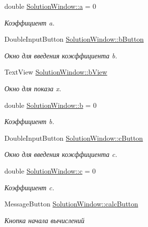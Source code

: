 \begin{DoxyCompactItemize}
double \hyperlink{group___u_i_ga4a34577d3eee1be3aa79ae62b4292ee3}{SolutionWindow::a} = 0
\begin{DoxyCompactList}\small\item\em Коэффициент a. \item\end{DoxyCompactList}\item 
DoubleInputButton \hyperlink{group___u_i_ga2a7741741b2199ac222556281f1474c0}{SolutionWindow::bButton}
\begin{DoxyCompactList}\small\item\em Окно для введения кожффициента b. \item\end{DoxyCompactList}\item 
TextView \hyperlink{group___u_i_ga5bbdd7ce43a736efddb212202d968229}{SolutionWindow::bView}
\begin{DoxyCompactList}\small\item\em Окно для показа x. \item\end{DoxyCompactList}\item 
double \hyperlink{group___u_i_ga4309ca79bdd7b0fedaedecb6e6e31f04}{SolutionWindow::b} = 0
\begin{DoxyCompactList}\small\item\em Коэффициент b. \item\end{DoxyCompactList}\item 
DoubleInputButton \hyperlink{group___u_i_ga22a74e860b6aa9a54dc402636fdb6b38}{SolutionWindow::cButton}
\begin{DoxyCompactList}\small\item\em Окно для введения кожффициента c. \item\end{DoxyCompactList}\item 
double \hyperlink{group___u_i_ga30d6d773e312cb1fefce1d66ec691ffa}{SolutionWindow::c} = 0
\begin{DoxyCompactList}\small\item\em Коэффициент c. \item\end{DoxyCompactList}\item 
MessageButton \hyperlink{group___u_i_ga1022c37f483309ed22237043b5454614}{SolutionWindow::calcButton}
\begin{DoxyCompactList}\small\item\em Кнопка начала вычислений \item\end{DoxyCompactList}\item 

\end{DoxyCompactItemize}
